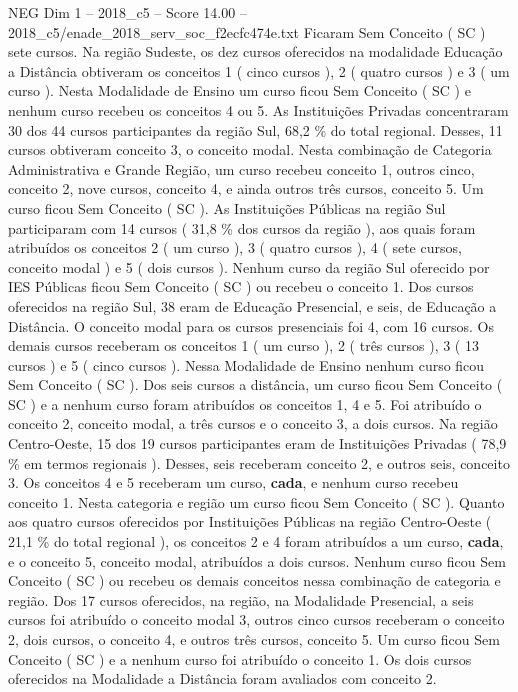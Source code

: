 \begin{textsample}{NEG Dim 1 – 2018\_c5 – Score 14.00 – 2018\_c5/enade\_2018\_serv\_soc\_f2ecfc474e.txt}
Ficaram Sem Conceito ( SC ) sete cursos.
Na região Sudeste, os dez cursos oferecidos na modalidade Educação a Distância obtiveram os conceitos 1 ( cinco cursos ), 2 ( quatro cursos ) e 3 ( um curso ).
Nesta Modalidade de Ensino um curso ficou Sem Conceito ( SC ) e nenhum curso recebeu os conceitos 4 ou 5.
As Instituições Privadas concentraram 30 dos 44 cursos participantes da região Sul, 68,2 \% do total regional.
Desses, 11 cursos obtiveram conceito 3, o conceito modal.
Nesta combinação de Categoria Administrativa e Grande Região, um curso recebeu conceito 1, outros cinco, conceito 2, nove cursos, conceito 4, e ainda outros três cursos, conceito 5.
Um curso ficou Sem Conceito ( SC ).
As Instituições Públicas na região Sul participaram com 14 cursos ( 31,8 \% dos cursos da região ), aos quais foram atribuídos os conceitos 2 ( um curso ), 3 ( quatro cursos ), 4 ( sete cursos, conceito modal ) e 5 ( dois cursos ).
Nenhum curso da região Sul oferecido por IES Públicas ficou Sem Conceito ( SC ) ou recebeu o conceito 1.
Dos cursos oferecidos na região Sul, 38 eram de Educação Presencial, e seis, de Educação a Distância.
O conceito modal para os cursos presenciais foi 4, com 16 cursos.
Os demais cursos receberam os conceitos 1 ( um curso ), 2 ( três cursos ), 3 ( 13 cursos ) e 5 ( cinco cursos ).
Nessa Modalidade de Ensino nenhum curso ficou Sem Conceito ( SC ).
Dos seis cursos a distância, um curso ficou Sem Conceito ( SC ) e a nenhum curso foram atribuídos os conceitos 1, 4 e 5.
Foi atribuído o conceito 2, conceito modal, a três cursos e o conceito 3, a dois cursos.
Na região Centro-Oeste, 15 dos 19 cursos participantes eram de Instituições Privadas ( 78,9 \% em termos regionais ).
Desses, seis receberam conceito 2, e outros seis, conceito 3.
Os conceitos 4 e 5 receberam um curso, \textbf{cada}, e nenhum curso recebeu conceito 1.
Nesta categoria e região um curso ficou Sem Conceito ( SC ).
Quanto aos quatro cursos oferecidos por Instituições Públicas na região Centro-Oeste ( 21,1 \% do total regional ), os conceitos 2 e 4 foram atribuídos a um curso, \textbf{cada}, e o conceito 5, conceito modal, atribuídos a dois cursos.
Nenhum curso ficou Sem Conceito ( SC ) ou recebeu os demais conceitos nessa combinação de categoria e região.
Dos 17 cursos oferecidos, na região, na Modalidade Presencial, a seis cursos foi atribuído o conceito modal 3, outros cinco cursos receberam o conceito 2, dois cursos, o conceito 4, e outros três cursos, conceito 5.
Um curso ficou Sem Conceito ( SC ) e a nenhum curso foi atribuído o conceito 1.
Os dois cursos oferecidos na Modalidade a Distância foram avaliados com conceito 2.

\end{textsample}
